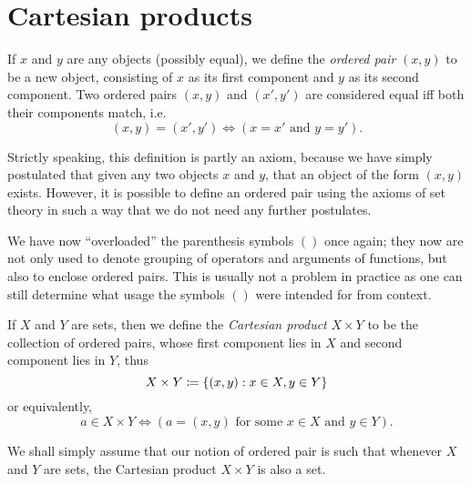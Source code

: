 \section{Cartesian products}\label{sec:3.5}

\begin{defn}\label{3.5.1}
	If \(x\) and \(y\) are any objects (possibly equal), we define the \emph{ordered pair} \((x, y)\) to be a new object, consisting of \(x\) as its first component and \(y\) as its second component.
	Two ordered pairs \((x, y)\) and \((x', y')\) are considered equal iff both their components match, i.e.
	\[
		(x, y) = (x', y') \iff (x = x' \text{ and } y = y').
	\]
\end{defn}

\begin{rmk}\label{3.5.2}
	Strictly speaking, this definition is partly an axiom, because we have simply postulated that given any two objects \(x\) and \(y\), that an object of the form \((x, y)\) exists.
	However, it is possible to define an ordered pair using the axioms of set theory in such a way that we do not need any further postulates.
\end{rmk}

\begin{rmk}\label{3.5.3}
	We have now ``overloaded'' the parenthesis symbols \(()\) once again;
	they now are not only used to denote grouping of operators and arguments of functions, but also to enclose ordered pairs.
	This is usually not a problem in practice as one can still determine what usage the symbols \(()\) were intended for from context.
\end{rmk}

\begin{defn}\label{3.5.4}
	If \(X\) and \(Y\) are sets, then we define the \emph{Cartesian product} \(X \times Y\) to be the collection of ordered pairs, whose first component lies in \(X\) and second component lies in \(Y\), thus
	\[
		X \times Y \coloneqq \left\lbrace(x, y) : x \in X, y \in Y\right\rbrace
	\]
	or equivalently,
	\[
		a \in X \times Y \iff (a = (x, y) \text{ for some } x \in X \text{ and } y \in Y).
	\]
\end{defn}

\begin{rmk}\label{3.5.5}
	We shall simply assume that our notion of ordered pair is such that whenever \(X\) and \(Y\) are sets, the Cartesian product \(X \times Y\) is also a set.
\end{rmk}

